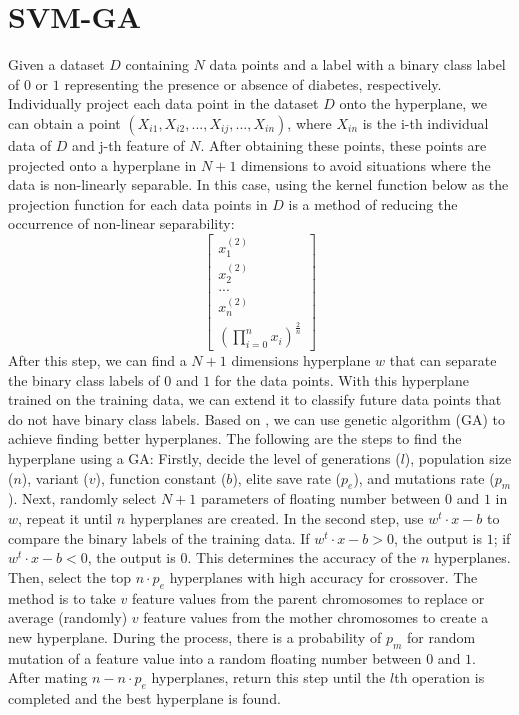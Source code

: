 \documentclass[twocolumn,10pt]{article}
\begin{document}
\section{SVM-GA}
  Given a dataset $D$ containing $N$ data points and a label with a binary class label of $0$ or $1$ representing the presence 
  or absence of diabetes, respectively. Individually project each data point in the dataset $D$ onto the hyperplane, we can obtain 
  a point $(X_{i1}, X_{i2}, ..., X_{ij}, ..., X_{in})$, where $X_{in}$ is the i-th individual data of $D$ and  j-th feature of $N$. 
  After obtaining these points, these points are projected onto a hyperplane in $N+1$ dimensions to avoid situations where the 
  data is non-linearly separable. 
  In this case, using the kernel function below as the projection function for each data points in $D$ is a method of reducing 
  the occurrence of non-linear separability: 
	$$\begin{bmatrix}x_1^{(2)} \\x_2^{(2)} \\... \\x_n^{(2)} \\ (\prod_{i=0}^{n} x_i)^{\frac{2}{n}} \end{bmatrix}$$
  After this step, we can find a $N+1$ dimensions hyperplane $w$ that can separate the binary class labels of $0$ and $1$ for 
  the data points. With this hyperplane trained on the training data, we can extend it to classify future data points that do 
  not have binary class labels. 
  Based on \cite{santhanam2015application}, we can use genetic algorithm (GA) to achieve finding better hyperplanes. The following are the 
  steps to find the hyperplane using a GA: Firstly, decide the level of generations ($l$), population size ($n$), 
  variant ($v$), function constant ($b$), elite save rate ($p_e$), and mutations rate ($p_m$). Next, randomly select $N+1$ parameters 
  of floating number between $0$ and $1$ in $w$, repeat it until $n$ hyperplanes are created. 
  In the second step, use $w^t \cdot x - b$ \cite{kumari2013classification} to compare the binary labels of the training data. If 
  $w^t \cdot x - b > 0$, the output is $1$; if $w^t \cdot x - b < 0$, the output is $0$. This determines the accuracy of the $n$ hyperplanes. 
  Then, select the top $n \cdot p_e$ hyperplanes with high accuracy for crossover. The method is to take $v$ feature values from 
  the parent chromosomes to replace or average (randomly) $v$ feature values from the mother chromosomes to create a new hyperplane. 
  During the process, there is a probability of $p_m$ for random mutation of a feature value into a random floating number between 
  $0$ and $1$. After mating $n-n \cdot p_e$ hyperplanes, return this step until the $l$th operation is completed and the best hyperplane 
  is found.
   
\end{document}

